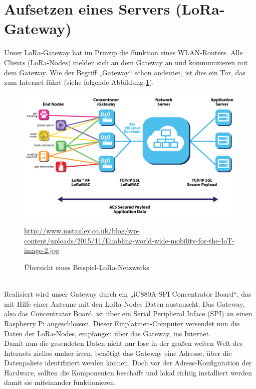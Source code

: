 \section{Aufsetzen eines Servers (LoRa-Gateway)}
Unser LoRa-Gateway hat im Prinzip die Funktion eines WLAN-Routers. Alle Clients (LoRa-Nodes) melden sich an dem Gateway an und kommunizieren mit dem Gateway. Wie der Begriff „Gateway“ schon andeutet, ist dies ein Tor, das zum Internet führt (siehe folgende Abbildung \ref{fig:lora-schaubild}).
\begin{figure}[ht]
    \center
    \includegraphics[width=15cm]{Bilder/lora-schaubild.jpg}\\
    \caption{Übersicht eines Beispiel-LoRa-Netzwerks}
    \begin{center} \quelle\url{http://www.mstanley.co.uk/blog/wp-content/uploads/2015/11/Enabling-world-wide-mobility-for-the-IoT-image-2.jpg} \end{center}
    \label{fig:lora-schaubild}
\end{figure}\\
Realisiert wird unser Gateway durch ein „iC880A-SPI Concentrator Board“, das mit Hilfe einer Antenne mit den LoRa-Nodes Daten austauscht. Das Gateway, also das Concentrator Board, ist über ein Serial Peripheral Inface (SPI) an einen Raspberry Pi angeschlossen. Dieser Einplatinen-Computer versendet nun die Daten der LoRa-Nodes, empfangen über das Gateway, ins Internet.\\
Damit nun die gesendeten Daten nicht nur lose in der großen weiten Welt des Internets ziellos umher irren, benötigt das Gateway eine Adresse, über die Datenpakete identifiziert werden können. Doch vor der Adress-Konfiguration der Hardware, sollten die Komponenten beschafft und lokal richtig installiert werden damit sie miteinander funktionieren.\\

